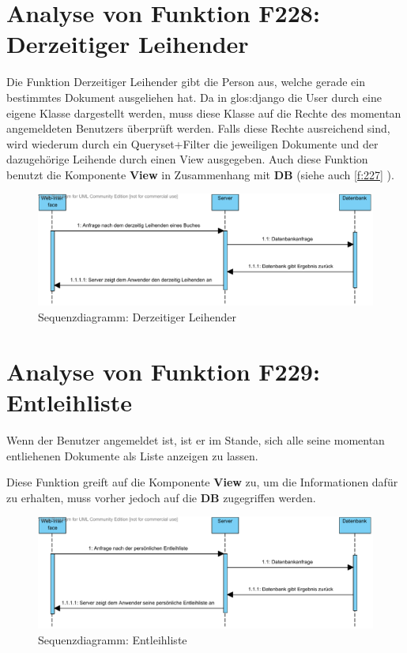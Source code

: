 \section{Analyse von Funktion F228: Derzeitiger Leihender}
\label{f:228}
Die Funktion Derzeitiger Leihender gibt die Person aus, welche gerade ein bestimmtes Dokument ausgeliehen hat.
Da in \gls{glos:django} die User durch eine eigene Klasse dargestellt werden, muss diese Klasse auf die Rechte des momentan angemeldeten Benutzers überprüft werden. Falls diese Rechte ausreichend sind, wird wiederum durch ein Queryset+Filter die jeweiligen Dokumente und der dazugehörige Leihende durch einen View ausgegeben.
Auch diese Funktion benutzt die Komponente \textbf{View} in Zusammenhang mit \textbf{DB} (siehe auch \ref{f:227} ).
\begin{figure}[H]
\includegraphics[width=0.8\linewidth]{bilder/F228.pdf}
\caption{Sequenzdiagramm: Derzeitiger Leihender}
\label{fig:228}
\end{figure}



\section{Analyse von Funktion F229: Entleihliste}
Wenn der Benutzer angemeldet ist, ist er im Stande, sich alle seine momentan entliehenen Dokumente als Liste anzeigen zu lassen.

Diese Funktion greift auf die Komponente \textbf{View} zu, um die Informationen dafür zu erhalten, muss vorher jedoch auf die \textbf{DB} zugegriffen werden.
\begin{figure}[H]
\includegraphics[width=0.8\linewidth]{bilder/F229.pdf}
\caption{Sequenzdiagramm: Entleihliste}
\label{fig:229}
\end{figure}
